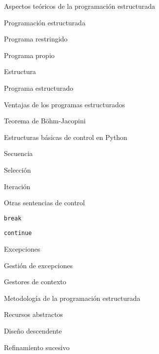 \begin{longenum}
    \begin{longenum}
        \item Aspectos teóricos de la programación estructurada
        \begin{longenum}
            \item Programación estructurada
            \item Programa restringido
            \item Programa propio
            \item Estructura
            \item Programa estructurado
            \begin{longenum}
                \item Ventajas de los programas estructurados
            \end{longenum}
            \item Teorema de Böhm-Jacopini
        \end{longenum}
        \item Estructuras básicas de control en Python
        \begin{longenum}
            \item Secuencia
            \item Selección
            \item Iteración
            \item Otras sentencias de control
            \begin{longenum}
                \item \texttt{break}
                \item \texttt{continue}
                \item Excepciones
                \begin{longenum}
                    \item Gestión de excepciones
                \end{longenum}
                \item Gestores de contexto
            \end{longenum}
        \end{longenum}
        \item Metodología de la programación estructurada
        \begin{longenum}
            \item Recursos abstractos
            \item Diseño descendente
            \item Refinamiento sucesivo
        \end{longenum}

\end{longenum}
\end{longenum}
